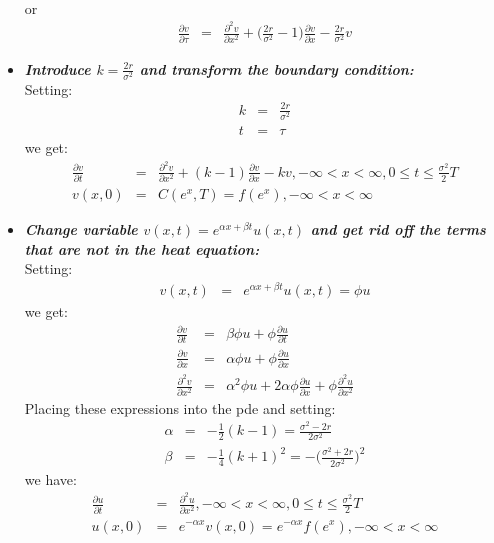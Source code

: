 \begin{itemize}
\begin{eqnarray}
	\end{eqnarray}
	or
	\begin{eqnarray}
	\frac{\partial v}{\partial \tau} &=& \frac{\partial ^{2}v}{\partial x^{2}} + \bigg(\frac{2r}{\sigma^{2}} - 1\bigg)\frac{\partial v}{\partial x} - \frac{2r}{\sigma^{2}}v
	\end{eqnarray}
	\item \textbf{\textit{Introduce $k = \frac{2r}{\sigma ^{2}}$ and transform the boundary condition:}}\\
	Setting:
	\begin{eqnarray}
	k &=& \frac{2r}{\sigma^{2}}\\
	t &=& \tau
	\end{eqnarray}
	we get:
	\begin{eqnarray}
	\frac{\partial v}{\partial t} &=& \frac{\partial ^{2}v}{\partial x^{2}} + (k - 1)\frac{\partial v}{\partial x} - kv, -\infty < x < \infty, 0\leq t \leq \frac{\sigma ^{2}}{2}T\\
	v(x, 0) &=& C(e^{x}, T) = f(e^{x}), -\infty < x < \infty
	\end{eqnarray}
	\item \textbf{\textit{Change variable $v(x, t) = e^{\alpha x + \beta t}u(x, t)$ and get rid off the terms that are not in the heat equation:}}\\
	Setting:
	\begin{eqnarray}
	v(x, t) &=& e^{\alpha x + \beta t}u(x, t) = \phi u	
	\end{eqnarray}
	we get:
	\begin{eqnarray}
		\frac{\partial v}{\partial t} &=& \beta\phi u + \phi \frac{\partial u}{\partial t}\\
		\frac{\partial v}{\partial x} &=& \alpha\phi u + \phi\frac{\partial u}{\partial x}\\
		\frac{\partial ^{2}v}{\partial x^{2}} &=& \alpha^{2}\phi u + 2\alpha\phi\frac{\partial u}{\partial x} + \phi\frac{\partial ^{2}u}{\partial x^{2}}
	\end{eqnarray}
	Placing these expressions into the pde and setting:
	\begin{eqnarray}
	\alpha &=& -\frac{1}{2}(k - 1) = \frac{\sigma ^{2} - 2r}{2\sigma^{2}}\\
	\beta &=& -\frac{1}{4}(k + 1)^{2} = -\bigg(\frac{\sigma^{2} + 2r}{2\sigma^{2}}\bigg)^{2}
	\end{eqnarray}
	we have:
	\begin{eqnarray}
		\frac{\partial u}{\partial t} &=& \frac{\partial ^{2}u}{\partial x^{2}}, -\infty < x < \infty, 0 \leq t \leq \frac{\sigma ^{2}}{2}T\\
		u(x, 0) &=& e^{-\alpha x}v(x, 0) = e^{-\alpha x}f(e^{x}), -\infty < x < \infty 
	\end{eqnarray}
\end{itemize}


